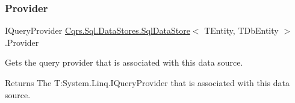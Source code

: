 \subsubsection{\texorpdfstring{Provider}{Provider}}
{\footnotesize\ttfamily I\+Query\+Provider \hyperlink{classCqrs_1_1Sql_1_1DataStores_1_1SqlDataStore}{Cqrs.\+Sql.\+Data\+Stores.\+Sql\+Data\+Store}$<$ T\+Entity, T\+Db\+Entity $>$.Provider\hspace{0.3cm}{\ttfamily [get]}}



Gets the query provider that is associated with this data source. 

\begin{DoxyReturn}{Returns}
The T\+:\+System.\+Linq.\+I\+Query\+Provider that is associated with this data source. 
\end{DoxyReturn}
